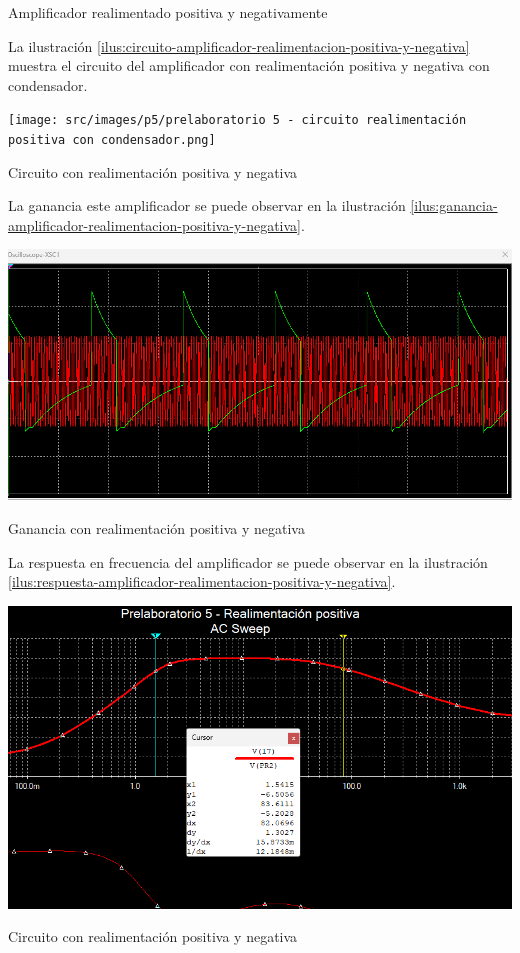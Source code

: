 Amplificador realimentado positiva y negativamente

La ilustración \ref{ilus:circuito-amplificador-realimentacion-positiva-y-negativa} muestra el circuito del amplificador con realimentación positiva y negativa con condensador.

\begin{ilustracion}[ht]
    \centering
    \texttt{[image: src/images/p5/prelaboratorio 5 - circuito realimentación positiva con condensador.png]}
    \caption{Circuito con realimentación positiva y negativa} 
    \label{ilus:circuito-amplificador-realimentacion-positiva-y-negativa}
\end{ilustracion}
\FloatBarrier

La ganancia este amplificador se puede observar en la ilustración \ref{ilus:ganancia-amplificador-realimentacion-positiva-y-negativa}.
\begin{ilustracion}[ht]
    \centering
    \includegraphics[width=\textwidth]{src/images/p5/Prelaboratorio 5 - Ganancia realimentacion positiva con condensador.png}
    \caption{Ganancia con realimentación positiva y negativa} 
    \label{ilus:ganancia-amplificador-realimentacion-positiva-y-negativa}
\end{ilustracion}
\FloatBarrier

La respuesta en frecuencia del amplificador se puede observar en la ilustración \ref{ilus:respuesta-amplificador-realimentacion-positiva-y-negativa}.

\begin{ilustracion}[ht]
    \centering
    \includegraphics[width=\textwidth]{src/images/p5/Prelaboratorio 5 - Respuesta en frecuencia - realimentacion positiva con condensador.png}
    \caption{Circuito con realimentación positiva y negativa} 
    \label{ilus:respuesta-amplificador-realimentacion-positiva-y-negativa}
\end{ilustracion}
